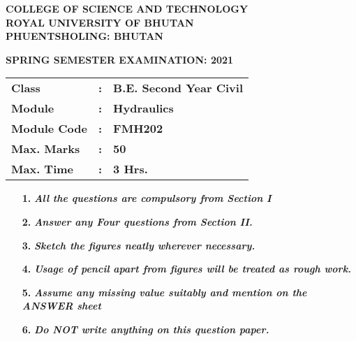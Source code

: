 \documentclass[12pt, addpoints,a5paper]{exam}
\begin{document}
	\qquad \qquad \qquad \qquad\qquad \qquad{}
	\bigskip 
	\noindent
	
	
	\begin{minipage}[c]{\textwidth}
		\begin{center}
			{\bfseries COLLEGE OF SCIENCE AND TECHNOLOGY\\
				ROYAL UNIVERSITY OF BHUTAN\\
				PHUENTSHOLING: BHUTAN}
		\end{center}
	\end{minipage}
	\bigskip
	
	\begin{center}
		{\bfseries SPRING SEMESTER EXAMINATION: 2021}
	\end{center}
	
	\begin{tabular}{lll}
		{\bfseries Class} & {\bfseries :} & {\bfseries B.E. Second Year Civil}\\[2ex]
		{\bfseries Module} & {\bfseries :} & {\bfseries Hydraulics}\\[2ex]
		{\bfseries Module Code} & {\bfseries :} & {\bfseries FMH202}\\[2ex]
		{\bfseries Max. Marks} & {\bfseries :} & {\bfseries 50}\\[2ex]
		{\bfseries Max. Time} & {\bfseries :} & {\bfseries 3 Hrs.}
	\end{tabular}
	
	\bigskip
	
	\hspace*{0pt}{\bfseries \, General Instructions:}
	\begin{enumerate}
		\item[{\bfseries 1.}] {\bfseries \itshape All the questions are compulsory from Section I}
		\item[{\bfseries 2.}] {\bfseries \itshape Answer any Four questions from Section II.}
		\item[{\bfseries 3.}] {\bfseries \itshape Sketch the figures neatly wherever necessary.}
		\item[{\bfseries 4.}] {\bfseries \itshape Usage of pencil apart from figures will be treated as rough work.}
		\item[{\bfseries 5.}] {\bfseries \itshape Assume any missing value suitably and mention on the ANSWER sheet}
		\item[{\bfseries 6.}] {\bfseries \itshape Do NOT write anything on this question paper.}
	\end{enumerate}
	
\end{document}
